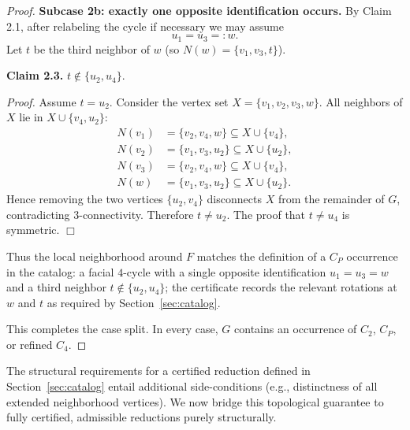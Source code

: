 \documentclass[12pt]{article}
\theoremstyle{definition}
\begin{document}
\begin{proof}
\medskip
\noindent\textbf{Subcase 2b: exactly one opposite identification occurs.}
By Claim 2.1, after relabeling the cycle if necessary we may assume
\[
u_1=u_3=:w.
\]
Let $t$ be the third neighbor of $w$ (so $N(w)=\{v_1,v_3,t\}$).

\smallskip
\noindent\textbf{Claim 2.3.} $t\notin\{u_2,u_4\}$.

\smallskip
\noindent\emph{Proof.}
Assume $t=u_2$. Consider the vertex set $X=\{v_1,v_2,v_3,w\}$.
All neighbors of $X$ lie in $X\cup\{v_4,u_2\}$:
\[
\begin{aligned}
N(v_1)&=\{v_2,v_4,w\}\subseteq X\cup\{v_4\},\\
N(v_2)&=\{v_1,v_3,u_2\}\subseteq X\cup\{u_2\},\\
N(v_3)&=\{v_2,v_4,w\}\subseteq X\cup\{v_4\},\\
N(w)&=\{v_1,v_3,u_2\}\subseteq X\cup\{u_2\}.
\end{aligned}
\]
Hence removing the two vertices $\{u_2,v_4\}$ disconnects $X$ from the remainder of $G$,
contradicting $3$-connectivity. Therefore $t\neq u_2$. The proof that $t\neq u_4$ is symmetric.
\hfill$\Box$

\smallskip
\noindent
Thus the local neighborhood around $F$ matches the definition of a $C_P$
occurrence in the catalog: a facial $4$-cycle with a single opposite identification $u_1=u_3=w$
and a third neighbor $t\notin\{u_2,u_4\}$; the certificate records the relevant rotations
at $w$ and $t$ as required by Section~\ref{sec:catalog}.

\medskip
\noindent
This completes the case split. In every case, $G$ contains an occurrence of
$C_2$, $C_P$, or refined $C_4$.
\end{proof}


The structural requirements for a certified reduction defined in Section~\ref{sec:catalog} entail additional side-conditions (e.g., distinctness of all extended neighborhood vertices). We now bridge this topological guarantee to fully certified, admissible reductions purely structurally.
\end{document}

